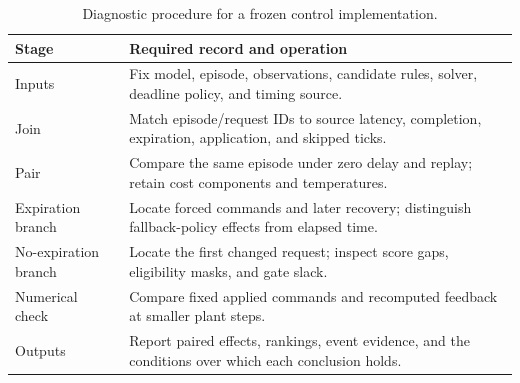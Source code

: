 \begin{table}[tbp]
\centering
\caption{Diagnostic procedure for a frozen control implementation.}
\label{tab:procedure}
\footnotesize
\setlength{\tabcolsep}{3pt}
\begin{tabularx}{\linewidth}{@{}lY@{}}
\toprule
Stage & Required record and operation\\
\midrule
Inputs & Fix model, episode, observations, candidate rules, solver, deadline policy, and timing source.\\
Join & Match episode/request IDs to source latency, completion, expiration, application, and skipped ticks.\\
Pair & Compare the same episode under zero delay and replay; retain cost components and temperatures.\\
Expiration branch & Locate forced commands and later recovery; distinguish fallback-policy effects from elapsed time.\\
No-expiration branch & Locate the first changed request; inspect score gaps, eligibility masks, and gate slack.\\
Numerical check & Compare fixed applied commands and recomputed feedback at smaller plant steps.\\
Outputs & Report paired effects, rankings, event evidence, and the conditions over which each conclusion holds.\\
\bottomrule
\end{tabularx}
\end{table}

